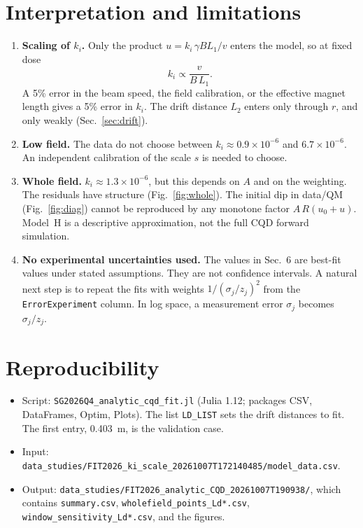 \documentclass[11pt,a4paper]{article}
\begin{document}
\section{Interpretation and limitations}
\begin{enumerate}
\item \textbf{Scaling of $k_i$.} Only the product $u = k_i\,\gamma B L_1/v$ enters the model, so at fixed dose
\[
k_i \propto \frac{v}{B\,L_1}.
\]
A 5\% error in the beam speed, the field calibration, or the effective magnet length gives a 5\% error in $k_i$. The drift distance $L_2$ enters only through $r$, and only weakly (Sec.~\ref{sec:drift}).
\item \textbf{Low field.} The data do not choose between $k_i\approx 0.9\times10^{-6}$ and $6.7\times10^{-6}$. An independent calibration of the scale $s$ is needed to choose.
\item \textbf{Whole field.} $k_i\approx 1.3\times10^{-6}$, but this depends on $A$ and on the weighting. The residuals have structure (Fig.~\ref{fig:whole}). The initial dip in data/QM (Fig.~\ref{fig:diag}) cannot be reproduced by any monotone factor $A\,R(u_0+u)$. Model~H is a descriptive approximation, not the full CQD forward simulation.
\item \textbf{No experimental uncertainties used.} The values in Sec.~6 are best-fit values under stated assumptions. They are not confidence intervals. A natural next step is to repeat the fits with weights $1/(\sigma_j/z_j)^2$ from the \texttt{ErrorExperiment} column. In log space, a measurement error $\sigma_j$ becomes $\sigma_j/z_j$.
\end{enumerate}

\section{Reproducibility}
{\sloppy
\begin{itemize}
\item Script: \texttt{SG2026Q4\_analytic\_cqd\_fit.jl} (Julia 1.12; packages CSV, DataFrames, Optim, Plots). The list \texttt{LD\_LIST} sets the drift distances to fit. The first entry, 0.403~m, is the validation case.
\item Input: \texttt{data\_studies/\allowbreak FIT2026\_ki\_scale\_20261007T172140485/\allowbreak model\_data.csv}.
\item Output: \texttt{data\_studies/\allowbreak FIT2026\_analytic\_CQD\_20261007T190938/}, which contains \texttt{summary.csv}, \texttt{wholefield\_points\_Ld*.csv}, \texttt{window\_sensitivity\_Ld*.csv}, and the figures.
\end{itemize}
\par}
\end{document}
